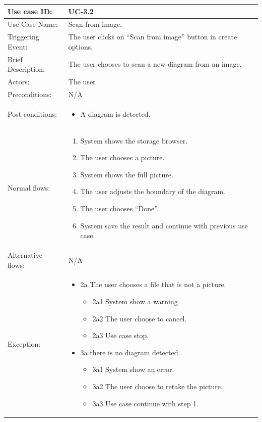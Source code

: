 \begin{table}[]
\begin{tabular}{| m{4cm} | m{11cm} |}
\hline
Use case ID:       & UC-3.2 \\ \hline
Use Case Name:     & Scan from image. \\ \hline
Triggering Event:  & The user clicks on “Scan from image” button in create options. \\ \hline
Brief Description: & The user chooses to scan a new diagram from an image.\\ \hline
Actors:            & The user \\ \hline
Preconditions:     & N/A\\ \hline
Post-conditions:   & \begin{itemize}
    \item A diagram is detected.
\end{itemize} \\ \hline
Normal flows:      & \begin{enumerate}
    \item System shows the storage browser.
    \item The user chooses a picture.
    \item System shows the full picture.
    \item The user adjusts the boundary of the diagram.
    \item The user chooses “Done”. 
    \item System save the result and continue with previous use case.
\end{enumerate} \\ \hline
Alternative flows: & N/A\\ \hline
Exception: & \begin{itemize}
    \item {2a The user chooses a file that is not a picture.}
    \begin{itemize}
        \item 2a1 System show a warning
        \item 2a2 The user choose to cancel.
        \item 2a3 Use case stop.
    \end{itemize}
    \item {3a there is no diagram detected.}
    \begin{itemize}
        \item 3a1 System show an error.
        \item 3a2 The user choose to retake the picture.
        \item 3a3 Use case continue with step 1.
    \end{itemize}
\end{itemize} \\ \hline
\end{tabular}
\end{table}

